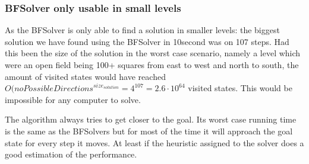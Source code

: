 \subsubsection{BFSolver only usable in small levels}
As the BFSolver is only able to find a solution in smaller levels: the biggest solution we have found using the BFSolver in 10second was on 107 steps. Had this been the size of the solution in the worst case scenario, namely a level which were an open field being 100+ squares from east to west and north to south, the amount of visited states would have reached $O({noPossibleDirections}^{size_{solution}} = 4^{107} = 2.6 \cdot 10^{64}$ visited states. This would be impossible for any computer to solve.

The \astar algorithm always tries to get closer to the goal. Its worst case running time is the same as the BFSolvers but for most of the time it will approach the goal state for every step it moves. At least if the heuristic assigned to the solver does a good estimation of the performance.

